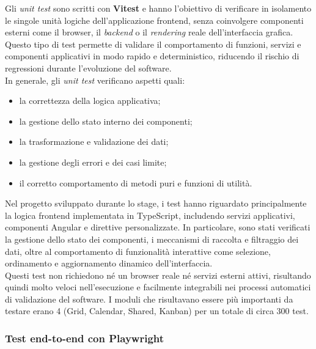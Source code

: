 Gli \emph{unit test} sono scritti con \textbf{Vitest} e hanno l’obiettivo di verificare
in isolamento le singole unità logiche dell’applicazione frontend, senza coinvolgere
componenti esterni come il browser, il \emph{backend} o il \emph{rendering} reale
dell’interfaccia grafica.
Questo tipo di test permette di validare il comportamento di funzioni, servizi e
componenti applicativi in modo rapido e deterministico, riducendo il rischio di
regressioni durante l’evoluzione del software.\\
In generale, gli \emph{unit test} verificano aspetti quali:
\begin{itemize}
      \item la correttezza della logica applicativa;
      \item la gestione dello stato interno dei componenti;
      \item la trasformazione e validazione dei dati;
      \item la gestione degli errori e dei casi limite;
      \item il corretto comportamento di metodi puri e funzioni di utilità.
\end{itemize}
Nel progetto sviluppato durante lo stage, i test hanno riguardato principalmente
la logica frontend implementata in TypeScript, includendo servizi applicativi,
componenti Angular e direttive personalizzate. In particolare, sono stati verificati
la gestione dello stato
dei componenti, i meccanismi di raccolta e filtraggio dei dati, oltre al comportamento
di funzionalità interattive come selezione, ordinamento e aggiornamento dinamico
dell’interfaccia.\\
Questi test non richiedono né un browser reale né servizi esterni attivi, risultando
quindi molto veloci nell’esecuzione e facilmente integrabili nei processi automatici
di validazione del software.
I moduli che risultavano essere più importanti da testare erano 4 (Grid, Calendar, Shared, Kanban)
per un totale di circa 300 test.

\subsubsection{Test end-to-end con Playwright}

